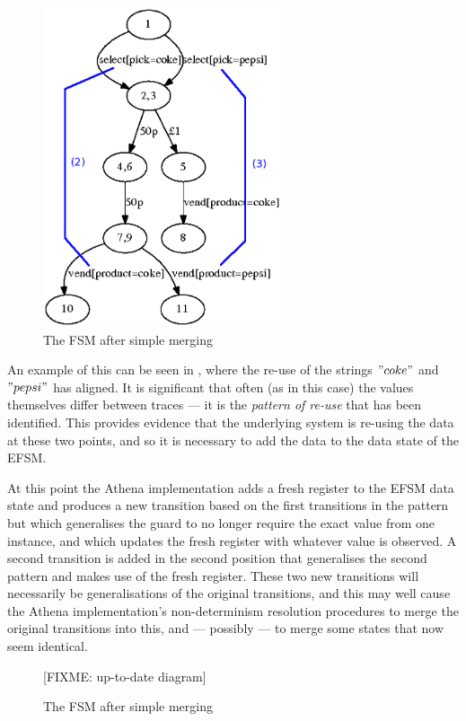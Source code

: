 \begin{figure}[h]
\begin{center}
\includegraphics[width=7cm]{figures/efsm/vend2-withannotations.eps}
\caption{The FSM after simple merging}
\label{fig:FSM}
\end{center}
\end{figure}

An example of this can be seen in , where the re-use of the strings $"coke"$ and $"pepsi"$ has aligned. It is significant that often (as in this case) the values themselves differ between traces --- it is the \emph{pattern of re-use} that has been identified. This provides evidence that the underlying system is re-using the data at these two points, and so it is necessary to add the data to the data state of the EFSM. 

At this point the Athena implementation adds a fresh register to the EFSM data state and produces a new transition based on the first transitions in the pattern but which generalises the guard to no longer require the exact value from one instance, and which updates the fresh register with whatever value is observed. A second transition is added in the second position that generalises the second pattern and makes use of the fresh register. These two new transitions will necessarily be generalisations of the original transitions, and this may well cause the Athena implementation's non-determinism resolution procedures to merge the original transitions into this, and --- possibly --- to merge some states that now seem identical.

\begin{figure}[h]
\begin{center}
[FIXME: up-to-date diagram]
\caption{The FSM after simple merging}
\label{fig:FSM}
\end{center}
\end{figure}


